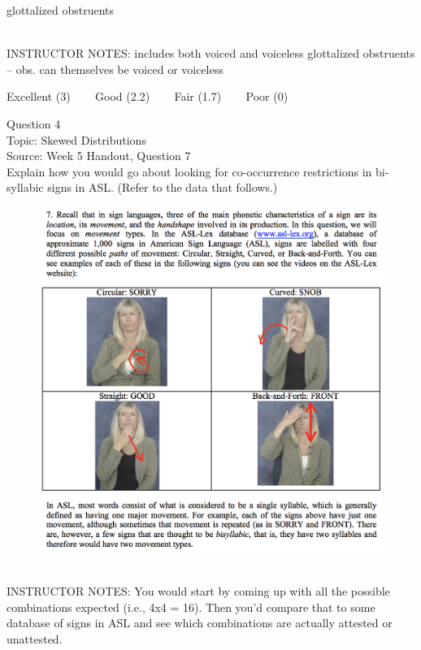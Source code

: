 \documentclass[12pt]{article}
\begin{document}
glottalized obstruents


~\\
INSTRUCTOR NOTES: includes both voiced and voiceless glottalized obstruents -- obs. can themselves be voiced or voiceless


\vfill
Excellent (3) ~~~ Good (2.2) ~~~ Fair (1.7) ~~~ Poor (0)
\newpage

{\large Question 4}\\

Topic: Skewed Distributions\\
Source: Week 5 Handout, Question 7\\

Explain how you would go about looking for co-occurrence restrictions in bi-syllabic signs in ASL. (Refer to the data that follows.)\\

\begin{figure}[H]
\includegraphics{../images/ASL_movement.png}
\end{figure}

~\\
INSTRUCTOR NOTES: You would start by coming up with all the possible combinations expected (i.e., 4x4 = 16). Then you'd compare that to some database of signs in ASL and see which combinations are actually attested or unattested.
\end{document}
